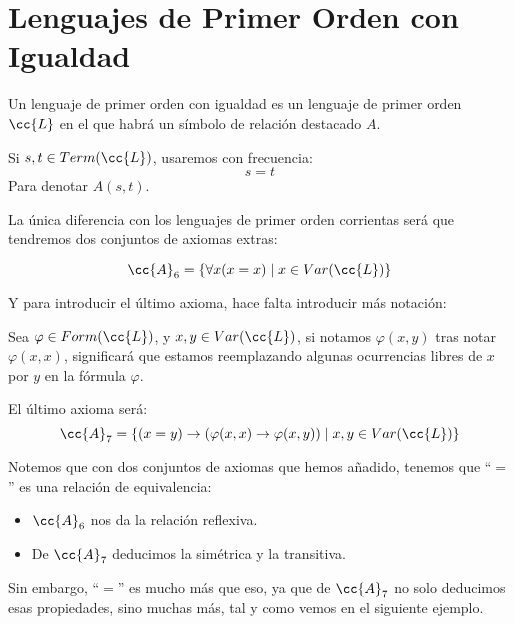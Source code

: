 \section{Lenguajes de Primer Orden con Igualdad}
Un lenguaje de primer orden con igualdad es un lenguaje de primer orden $\cc{L}$ en el que habrá un símbolo de relación destacado $A$.

\begin{notacion}
    Si $s,t\in Term(\cc{L})$, usaremos con frecuencia:
    \begin{equation*}
        s = t
    \end{equation*}
    Para denotar $A(s,t)$.
\end{notacion}

La única diferencia con los lenguajes de primer orden corrientas será que tendremos dos conjuntos de axiomas extras:

\begin{equation*}
    \cc{A}_6 = \{\forall x(x=x) \mid x\in Var(\cc{L})\}
\end{equation*}

Y para introducir el último axioma, hace falta introducir más notación:
\begin{notacion}
    Sea $\varphi \in Form(\cc{L})$, y $x,y\in Var(\cc{L})$, si notamos $\varphi(x,y)$ tras notar $\varphi(x,x)$, significará que estamos reemplazando algunas ocurrencias libres de $x$ por $y$ en la fórmula $\varphi$.
\end{notacion}
El último axioma será:
\begin{equation*}
    \cc{A}_7 = \{(x=y)\to (\varphi(x,x)\to \varphi(x,y))\mid x,y\in Var(\cc{L})\}
\end{equation*}

\begin{observacion}
    Notemos que con dos conjuntos de axiomas que hemos añadido, tenemos que ``$=$'' es una relación de equivalencia:
    \begin{itemize}
        \item $\cc{A}_6$ nos da la relación reflexiva.
        \item De $\cc{A}_7$ deducimos la simétrica y la transitiva.
    \end{itemize}
    Sin embargo, ``$=$'' es mucho más que eso, ya que de $\cc{A}_7$ no solo deducimos esas propiedades, sino muchas más, tal y como vemos en el siguiente ejemplo.
\end{observacion}

